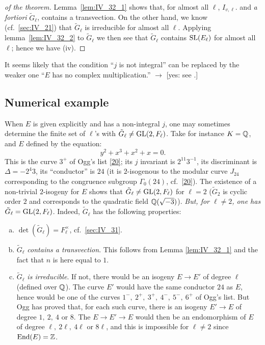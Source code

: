 \begin{proof}[ of the theorem]
	Lemma~\ref{lem:IV_32_1} shows that, for almost all $\ell$, $I_{v,
	\ell}$.  and \emph{a fortiori} $\widetilde{G}_\ell$, contains a
	transvection. On the other hand, we know (cf.\ \ref{sec:IV_21}) that
	$\widetilde{G}_\ell$ is irreducible for almost all $\ell$. Applying
	lemma~\ref{lem:IV_32_2} to $\widetilde{G}_\ell$ we then see that
	$\widetilde{G}_\ell$ contains $\operatorname{SL}({E}_{\ell})$ for almost all
	$\ell$; hence we have (iv).
\end{proof}

\begin{obs}
	It seems likely that the condition ``$j$ is not integral'' can be
	replaced by the weaker one ``$E$ has no complex multiplication.''
	$\to$ [yes: see \cite{76}.]
\end{obs}

\subsection{Numerical example}
\label{sec:IV_33}

When $E$ is given explicitly and has a non-integral $j$, one may sometimes
determine the finite set of $\ell$'s with $\tilde{G}_\ell \neq \operatorname{GL}(2, F_\ell)$.
Take for instance $K = \mathbb{Q}$, and $E$ defined by the equation:
\[
	y^2 + x^3 + x^2 + x = 0.
\]
This is the curve $3^+$ of Ogg's list \ref{20}; its $j$ invariant is $2^11
3^{-1}$, 
\dpage
its discriminant is $ \Delta = -2^4 3$, its ``conductor'' is $24$ (it is
$2$-isogenous to the modular curve $J_{24}$ corresponding to the congruence
subgroup $\Gamma_0(24)$, cf.\ \ref{20}). The existence of a non-trivial
$2$-isogeny for $E$ shows that $\tilde{G}_\ell \neq \operatorname{GL}(2, F_\ell)$ for $\ell =
2$ ($\tilde{G}_2$ is cyclic order $2$ and corresponds to the quadratic field
$\mathbb{Q}(\sqrt{-3})$). \emph{ But, for $\ell \neq 2$, one has $\tilde{G}_\ell =
\operatorname{GL}(2,F_\ell)$}. Indeed, $\tilde{G}_\ell$ has the following properties:
\begin{enumerate}[(a)]
	\item $\det(\tilde{G}_\ell) = F^\times_\ell$, cf.\ \ref{sec:IV_31}.
	\item $\tilde{G}_\ell$ \emph{contains a transvection}. This follows from
Lemma \ref{lem:IV_32_1} and the fact that $n$ is here equal to $1$.
	 \item $\tilde{G}_\ell$ \emph{is irreducible}. If not, there would be an
isogeny $E \to E'$ of degree $\ell$ (defined over $\mathbb{Q}$). The curve $E'$ would
have the same conductor $24$ as $E$, hence would be one of the curves
$1^-,~2^+,~3^+,~4^-,~5^-,~6^+$ of Ogg's list. But Ogg has proved that, for each
such curve, there is an isogeny $E' \to E$ of degree $1,~2,~4$ or $8$. The $E
\to E' \to E$ would then be an endomorphism of $E$ of degree
$\ell,~2\ell,~4\ell$ or $8\ell$, and this is impossible for $\ell \neq 2$ since
$\operatorname{End}(E) = \mathbb{Z}$.
\end{enumerate}


